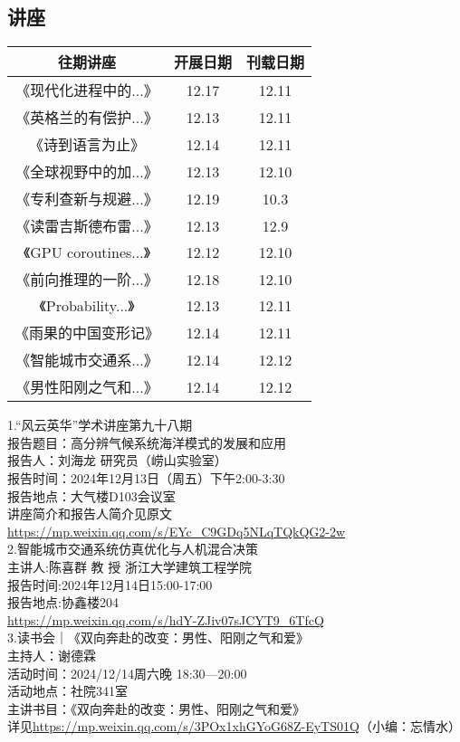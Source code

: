 \documentclass[letterpaper, 12pt]{article}
\begin{document}
\begin{multicols}{2}

\section{讲座}
\begin{tabular}{|c|c|c|}
    \hline
    往期讲座 & 开展日期 & 刊载日期\\
    \hline\hline
    《现代化进程中的...》 & 12.17 & 12.11\\
    《英格兰的有偿护...》 & 12.13 & 12.11\\
    《诗到语言为止》& 12.14 & 12.11\\
    《全球视野中的加...》& 12.13 & 12.10\\
    《专利查新与规避...》 & 12.19 & 10.3\\
    《读雷吉斯德布雷...》 & 12.13 & 12.9\\
    《GPU coroutines...》 & 12.12 & 12.10\\
    《前向推理的一阶...》 & 12.18 & 12.10\\
    《Probability...》 & 12.13 & 12.11\\
    《雨果的中国变形记》 & 12.14 & 12.11\\
    《智能城市交通系...》 & 12.14 & 12.12\\
    《男性阳刚之气和...》 & 12.14 & 12.12\\
    \hline
\end{tabular}

1.“风云英华”学术讲座第九十八期\\
报告题目：高分辨气候系统海洋模式的发展和应用\\
报告人：刘海龙  研究员（崂山实验室）\\
报告时间：2024年12月13日（周五）下午2:00-3:30\\
报告地点：大气楼D103会议室\\
讲座简介和报告人简介见原文\url{https://mp.weixin.qq.com/s/EYc_C9GDq5NLqTQkQG2-2w}\\

2.智能城市交通系统仿真优化与人机混合决策\\
主讲人:陈喜群 教 授 浙江大学建筑工程学院\\
报告时间:2024年12月14日15:00-17:00\\
报告地点:协鑫楼204\\
\url{https://mp.weixin.qq.com/s/hdY-ZJiv07sJCYT9_6TfcQ}\\

3.读书会｜《双向奔赴的改变：男性、阳刚之气和爱》\\
主持人：谢德霖\\
活动时间：2024/12/14周六晚 18:30—20:00\\
活动地点：社院341室\\
主讲书目：《双向奔赴的改变：男性、阳刚之气和爱》\\
详见\url{https://mp.weixin.qq.com/s/3POx1xhGYoG68Z-EyTS01Q}（小编：忘情水）

\end{multicols}
\end{document}
